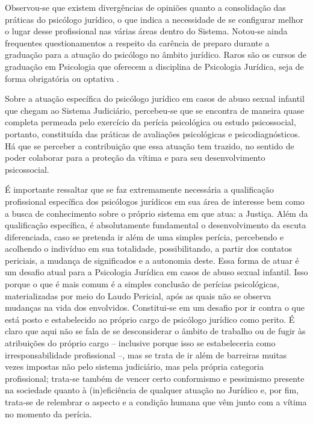 Observou-se que existem divergências de opiniões quanto a consolidação das práticas do psicólogo jurídico, o que indica a necessidade de se configurar melhor o lugar desse profissional nas várias áreas dentro do Sistema. Notou-se ainda frequentes questionamentos a respeito da carência de preparo durante a graduação para a atuação do psicólogo no âmbito jurídico. Raros são os cursos de graduação em Psicologia que oferecem a disciplina de Psicologia Jurídica, seja de forma obrigatória ou optativa \cite{ROVINSKI2004}.

Sobre a atuação específica do psicólogo jurídico em casos de abuso sexual infantil que chegam ao Sistema Judiciário, percebeu-se que se encontra de maneira quase completa permeada pelo exercício da perícia psicológica ou estudo psicossocial, portanto, constituída das práticas de avaliações psicológicas e psicodiagnósticos. Há que se perceber a contribuição que essa atuação tem trazido, no sentido de poder colaborar para a proteção da vítima e para seu desenvolvimento psicossocial. 
 
É importante ressaltar que se faz extremamente necessária a qualificação profissional específica dos psicólogos jurídicos em sua área de interesse bem como a busca de conhecimento sobre o próprio sistema em que atua: a Justiça. Além da qualificação específica, é absolutamente fundamental o desenvolvimento da escuta diferenciada, caso se pretenda ir além de uma simples perícia, percebendo e acolhendo o indivíduo em sua totalidade, possibilitando, a partir dos contatos periciais, a mudança de significados e a autonomia deste. Essa forma de atuar é um desafio atual para a Psicologia Jurídica em casos de abuso sexual infantil. Isso porque o que é mais comum é a simples conclusão de perícias psicológicas, materializadas por meio do Laudo Pericial, após as quais não se observa mudanças na vida dos envolvidos. Constitui-se em um desafio por ir contra o que está posto e estabelecido ao próprio cargo de psicólogo jurídico como perito. É claro que aqui não se fala de se desconsiderar o âmbito de trabalho ou de fugir às atribuições do próprio cargo -- inclusive porque isso se estabeleceria como irresponsabilidade profissional --, mas se trata de ir além de barreiras muitas vezes impostas não pelo sistema judiciário, mas pela própria categoria profissional; trata-se também de vencer certo conformismo e pessimismo presente na sociedade quanto à (in)eficiência de qualquer atuação no Jurídico e, por fim, trata-se de relembrar o aspecto e a condição humana que vêm junto com a vítima no momento da perícia.

